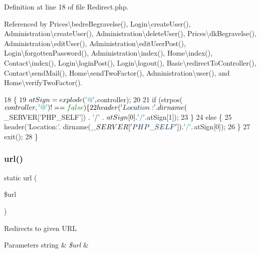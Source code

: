 Definition at line 18 of file Redirect.\+php.



Referenced by Prices\textbackslash{}bedre\+Begravelse(), Login\textbackslash{}create\+User(), Administration\textbackslash{}create\+User(), Administration\textbackslash{}delete\+User(), Prices\textbackslash{}dk\+Begravelse(), Administration\textbackslash{}edit\+User(), Administration\textbackslash{}edit\+User\+Post(), Login\textbackslash{}forgotten\+Password(), Administration\textbackslash{}index(), Home\textbackslash{}index(), Contact\textbackslash{}index(), Login\textbackslash{}login\+Post(), Login\textbackslash{}logout(), Basic\textbackslash{}redirect\+To\+Controller(), Contact\textbackslash{}send\+Mail(), Home\textbackslash{}send\+Two\+Factor(), Administration\textbackslash{}user(), and Home\textbackslash{}verify\+Two\+Factor().


\begin{DoxyCode}
18                                                    \{
19         $atSign = explode(\textcolor{charliteral}{'@'}, $controller);
20 
21         \textcolor{keywordflow}{if} (strpos($controller, \textcolor{charliteral}{'@'}) !== \textcolor{keyword}{false}) \{
22             header(\textcolor{stringliteral}{'Location:'} . dirname($\_SERVER[\textcolor{stringliteral}{'PHP\_SELF'}]) . \textcolor{charliteral}{'/'} . $atSign[0] . \textcolor{charliteral}{'/'} . $atSign[1]);
23         \}
24         \textcolor{keywordflow}{else} \{
25             header(\textcolor{stringliteral}{'Location:'}. dirname($\_SERVER[\textcolor{stringliteral}{'PHP\_SELF'}]) . \textcolor{charliteral}{'/'} . $atSign[0]);
26         \}
27         exit();
28     \}
\end{DoxyCode}
\hypertarget{class_redirect_a8c51feb32df9ae35002451714b7a9a73}{}\label{class_redirect_a8c51feb32df9ae35002451714b7a9a73} 
\subsubsection{\texorpdfstring{url()}{url()}}
{\footnotesize\ttfamily static url (\begin{DoxyParamCaption}\item[{}]{\$url }\end{DoxyParamCaption})\hspace{0.3cm}{\ttfamily [static]}}

Redirects to given U\+RL


\begin{DoxyParams}[1]{Parameters}
string & {\em \$url} & \\
\hline
\end{DoxyParams}


